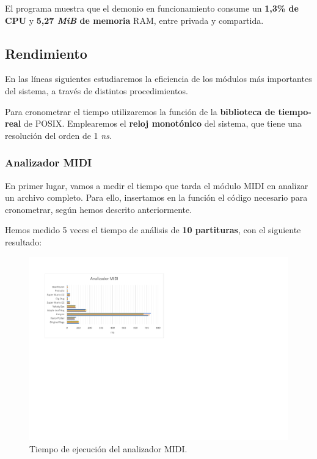\smallskip

El programa muestra que el demonio en funcionamiento consume un \textbf{1,3\% de \acrshort{CPU}} y \textbf{5,27 \textit{MiB} de memoria} RAM, entre privada y compartida.

\subsection{Rendimiento}

En las líneas siguientes estudiaremos la eficiencia de los módulos más importantes del sistema, a través de distintos procedimientos.

Para cronometrar el tiempo utilizaremos la función  de la \textbf{biblioteca de tiempo-real} de \acrshort{POSIX}. Emplearemos el \textbf{reloj monotónico} del sistema, que tiene una resolución del orden de 1 \textit{ns}.

\subsubsection{Analizador MIDI}

En primer lugar, vamos a medir el tiempo que tarda el módulo \acrshort{MIDI} en analizar un archivo completo. Para ello, insertamos en la función  el código necesario para cronometrar, según hemos descrito anteriormente.

Hemos medido 5 veces el tiempo de análisis de \textbf{10 partituras}, con el siguiente resultado:

\smallskip

\begin{figure}[H]
	\noindent \begin{centering}
		\includegraphics[width=\linewidth*3/4]{capitulo6/lat_midi}
		\par\end{centering}
	\smallskip
	\caption{\label{fig:lat_midi} Tiempo de ejecución del analizador MIDI.}
\end{figure} 

